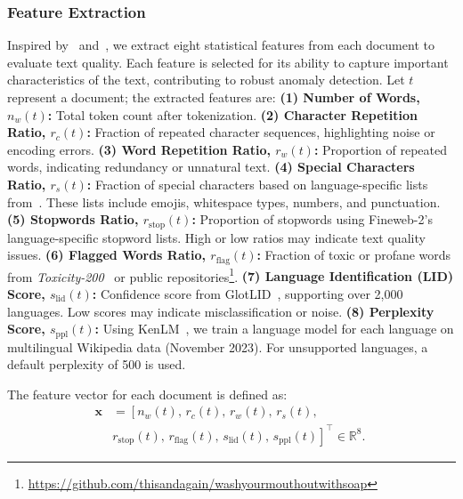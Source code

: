 \subsubsection{Feature Extraction}
\label{sec:feature_extract}
Inspired by~\citet{laurenccon2022bigscience} and~\citet{nguyen-etal-2024-culturax}, we extract eight statistical features from each document to evaluate text quality.
Each feature is selected for its ability to capture important characteristics of the text, contributing to robust anomaly detection.
Let $t$ represent a document; the extracted features are:
\textbf{(1) Number of Words, $n_w(t)$:} Total token count after tokenization.
\textbf{(2) Character Repetition Ratio, $r_c(t)$:} Fraction of repeated character sequences, highlighting noise or encoding errors.
\textbf{(3) Word Repetition Ratio, $r_w(t)$:} Proportion of repeated words, indicating redundancy or unnatural text.
\textbf{(4) Special Characters Ratio, $r_s(t)$:} Fraction of special characters based on language-specific lists from~\citet{laurenccon2022bigscience}. These lists include emojis, whitespace types, numbers, and punctuation.
\textbf{(5) Stopwords Ratio, $r_{\text{stop}}(t)$:} Proportion of stopwords using Fineweb-2's language-specific stopword lists. High or low ratios may indicate text quality issues.
\textbf{(6) Flagged Words Ratio, $r_{\text{flag}}(t)$:} Fraction of toxic or profane words from \textit{Toxicity-200}~\cite{costa2022no} or public repositories\footnote{\url{https://github.com/thisandagain/washyourmouthoutwithsoap}}.
\textbf{(7) Language Identification (LID) Score, $s_{\text{lid}}(t)$:} Confidence score from GlotLID~\cite{kargaran-etal-2023-glotlid}, supporting over 2,000 languages. Low scores may indicate misclassification or noise.
\textbf{(8) Perplexity Score, $s_{\text{ppl}}(t)$:} Using KenLM~\cite{heafield-2011-kenlm}, we train a language model for each language on multilingual Wikipedia data (November 2023). For unsupported languages, a default perplexity of 500 is used.

The feature vector for each document is defined as:
\begin{equation}
\begin{aligned}
\mathbf{x} &= \left[ n_w(t),\, r_c(t),\, r_w(t),\, r_s(t),\, \right. \\
&\left. r_{\text{stop}}(t),\, r_{\text{flag}}(t),\, s_{\text{lid}}(t),\, s_{\text{ppl}}(t) \right]^\top \in \mathbb{R}^8.\
\end{aligned}
\end{equation}

